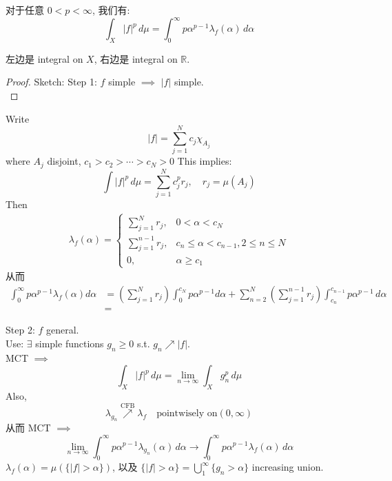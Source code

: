\documentclass[lang=cn,11pt]{elegantbook}
\begin{document}
\begin{proposition}
    对于任意 $0< p < \infty$, 我们有: \[
    \int_X |f|^p \, d\mu = \int_0^\infty p \alpha^{p-1} \lambda_f (\alpha ) \, d\alpha
    \]
\end{proposition}
左边是 integral on $X$, 右边是 integral on $\mathbb{R}$.

\begin{proof}
    Sketch: 
    Step 1: $f$ simple $\implies$ $|f|$ simple.\\
    
\end{proof}

Write \[
|f| = \sum_{j=1}^N c_j \chi_{A_j} 
\]where $A_j$ disjoint, $c_1 > c_2 > \cdots >  c_N > 0$
This implies: \[
\int |f| ^p \, d\mu = \sum_{j=1}^N c_j^p r_j,\quad r_j = \mu(A_j)
 \]
Then
\begin{align*}
\lambda_f (\alpha) = \begin{cases}
    \sum_{j=1}^N r_j,& 0 < \alpha < c_N\\
    \sum_{j=1}^{n-1} r_j,&c_n \leq \alpha  < c_{n-1}, 2\leq n \leq N\\
    0,& \alpha \geq c_1
\end{cases}    
\end{align*}
从而 
\begin{align*}
    \int_0^\infty p \alpha^{p-1} \lambda_f (\alpha) d\alpha & = (\sum_{j=1}^N r_j) \int_0^{c_N} p \alpha^{p-1} d\alpha + \sum_{n=2}^N (\sum_{j=1}^{n-1} r_j ) \int_{c_n}^{c_{n-1}} p\alpha^{p-1} \, d\alpha\\
    & = 
\end{align*}


Step 2: $f$ general.\\
Use: $\exists$ simple functions $g_n \geq 0$ s.t. $g_n \nearrow |f|$.\\
 MCT $\implies $ \[
 \int_X |f|^p \,d \mu = \lim_{n\to \infty} \int_X g_n^p \, d\mu
 \]
 Also, \[
\lambda_{g_n} \overset{\text{CFB} }{\nearrow  }  \lambda_f \quad \text{pointwisely on} (0,\infty)
 \]
从而  MCT $\implies $ \[
\lim_{n\to \infty} \int_0^\infty p\alpha^{p-1} \lambda_{g_n}(\alpha) \, d\alpha \to \int_0^\infty p \alpha^{p-1} \lambda_f (\alpha ) \, d\alpha
\]
$\lambda_f(\alpha) = \mu(\{ |f| > \alpha\})$, 以及 $\{ |f| > \alpha \} = \bigcup_1^\infty \{g_n > \alpha \} $ increasing union.
\end{document}
